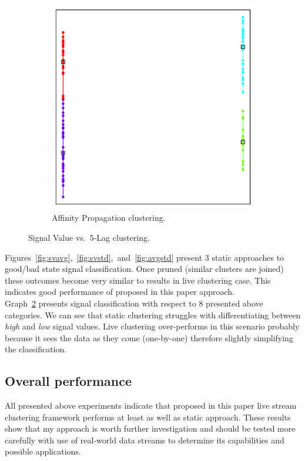 \documentclass[11pt, letterpaper]{article}            %
\begin{document}
\begin{figure}[htbp]
\begin{subfigure}[b]{0.32\textwidth}
    \includegraphics[height=\textwidth]{./gfx/ap35.png}
    \caption{Affinity Propagation clustering.\label{fig:svlag:ap}}
  \end{subfigure}

  \caption{Signal Value vs.\ 5-Lag clustering.\label{fig:svlag}}
\end{figure}

Figures~\ref{fig:svavg},~\ref{fig:svstd},~and~\ref{fig:avgstd} present 3 static approaches to good/bad state signal classification. Once pruned (similar clusters are joined) these outcomes become very similar to results in live clustering case. This indicates good performance of proposed in this paper approach.\\

Graph~\ref{fig:svlag} presents signal classification with respect to 8 presented above categories. We can see that static clustering struggles with differentiating between \emph{high} and \emph{low} signal values. Live clustering over-performs in this scenario probably because it sees the data as they come (one-by-one) therefore slightly simplifying the classification.\\

\subsection{Overall performance}
All presented above experiments indicate that proposed in this paper live stream clustering framework performs at least as well as static approach. These results show that my approach is worth further investigation and should be tested more carefully with use of real-world data streams to determine its capabilities and possible applications.
\end{document}
